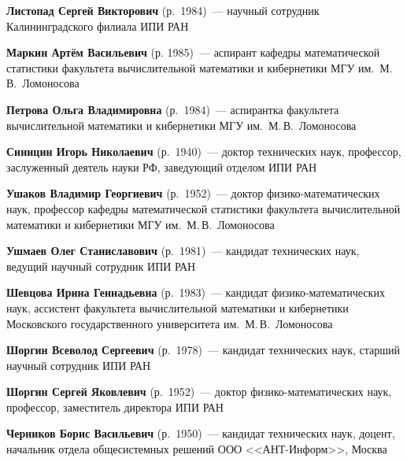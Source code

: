 \begin{multicols}{2}
\vspace*{6pt}

\noindent
\textbf{Листопад Сергей Викторович} (р.\ 1984)~--- научный сотрудник Калининградского филиала ИПИ РАН

\vspace*{6pt}

\noindent
\textbf{Маркин Артём Васильевич} (р. 1985)~--- аспирант 
кафедры математической статистики факультета вычислительной математики 
и кибернетики МГУ им.\ М.\,В.~Ломоносова

\vspace*{6pt}

\noindent
\textbf{Петрова Ольга Владимировна} (р.\ 1984)~--- аспирантка факультета вычислительной математики и кибернетики
МГУ им.\ М.\,В.~Ломоносова


\vspace*{6pt}

\noindent
\textbf{Синицин Игорь Николаевич} (р.\ 1940)~---  доктор технических наук,
профессор, заслуженный деятель науки РФ, заведующий отделом ИПИ РАН

\vspace*{6pt}

\noindent
\textbf{Ушаков Владимир Георгиевич} (р.\ 1952)~--- доктор физико-математических наук,
профессор кафедры математической статистики факультета вычислительной математики и кибернетики МГУ
им.\ М.\,В.~Ломоносова

\vspace*{6pt}

\noindent
\textbf{Ушмаев Олег Станиславович} (р.\ 1981)~---  кандидат
технических наук, ведущий научный сотрудник ИПИ РАН

\vspace*{6pt}

\noindent
\textbf{Шевцова Ирина Геннадьевна} (р.\ 1983)~--- кандидат физико-математических наук,
ассистент факультета вычислительной математики и кибернетики Московского 
государственного университета им.\ М.\,В.~Ломоносова

\vspace*{6pt}

\noindent
\textbf{Шоргин Всеволод Сергеевич} (р.\ 1978)~--- кандидат технических наук, старший 
научный сотрудник ИПИ РАН

\vspace*{6pt}

\noindent
\textbf{Шоргин Сергей Яковлевич} (р.\ 1952)~--- доктор физико-математических наук,
профессор, заместитель директора ИПИ РАН

\vspace*{6pt}

\noindent
\textbf{Черников Борис Васильевич} (р.\ 1950)~--- кандидат технических наук, доцент,
начальник отдела общесистемных решений ООО <<АНТ-Информ>>, Москва




\end{multicols}